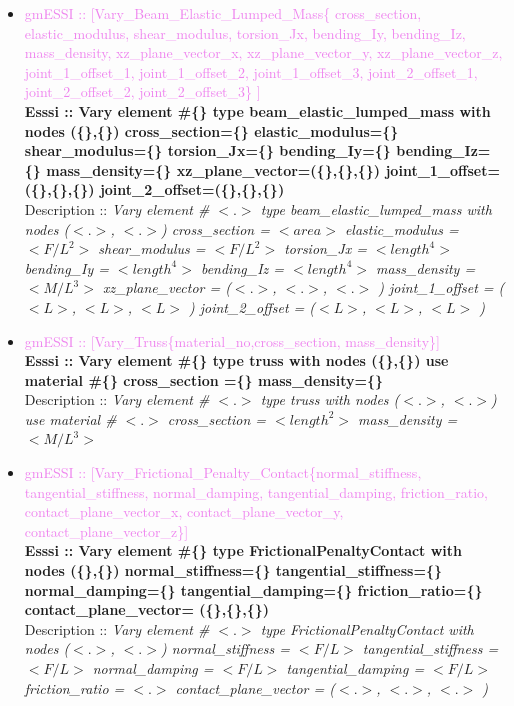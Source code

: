 \documentclass[11pt]{article}
\begin{document}
\begin{itemize}

  \item \textcolor{violet}{gmESSI :: [Vary\_Beam\_Elastic\_Lumped\_Mass\{ cross\_section, elastic\_modulus, shear\_modulus, torsion\_Jx, bending\_Iy, bending\_Iz, mass\_density, xz\_plane\_vector\_x, xz\_plane\_vector\_y, xz\_plane\_vector\_z, joint\_1\_offset\_1, joint\_1\_offset\_2, joint\_1\_offset\_3, joint\_2\_offset\_1, joint\_2\_offset\_2, joint\_2\_offset\_3\} ]} \\             
  \textbf{Esssi :: Vary element \#\{\} type beam\_elastic\_lumped\_mass with nodes (\{\},\{\}) cross\_section=\{\} elastic\_modulus=\{\} shear\_modulus=\{\} torsion\_Jx=\{\} bending\_Iy=\{\} bending\_Iz=\{\} mass\_density=\{\}  xz\_plane\_vector=(\{\},\{\},\{\}) joint\_1\_offset=(\{\},\{\},\{\}) joint\_2\_offset=(\{\},\{\},\{\})}\\
  Description :: \textit{ Vary element \# $<.>$ type beam\_elastic\_lumped\_mass with nodes ($<.>$, $<.>$) cross\_section = $<area>$ elastic\_modulus = $<F/L^2>$ shear\_modulus = $<F/L^2>$ torsion\_Jx = $<length^4>$ bending\_Iy = $<length^4>$ bending\_Iz = $<length^4>$ mass\_density = $<M/L^3>$  xz\_plane\_vector = ($<.>$, $<.>$, $<.>$ ) joint\_1\_offset = ($<L>$, $<L>$, $<L>$ ) joint\_2\_offset = ($<L>$, $<L>$, $<L>$ )}

  \item \textcolor{violet}{gmESSI :: [Vary\_Truss\{material\_no,cross\_section, mass\_density\}]} \\             
  \textbf{Esssi :: Vary element \#\{\} type truss with nodes (\{\},\{\}) use material \#\{\} cross\_section =\{\} mass\_density=\{\}}\\
  Description :: \textit{ Vary element \# $<.>$ type truss with nodes ($<.>$, $<.>$) use material \# $<.>$ cross\_section = $<length^2>$ mass\_density = $<M/L^3>$ }

  \item \textcolor{violet}{gmESSI :: [Vary\_Frictional\_Penalty\_Contact\{normal\_stiffness, tangential\_stiffness, normal\_damping, tangential\_damping, friction\_ratio, contact\_plane\_vector\_x, contact\_plane\_vector\_y, contact\_plane\_vector\_z\}]} \\             
  \textbf{Esssi :: Vary element \#\{\} type FrictionalPenaltyContact with nodes (\{\},\{\}) normal\_stiffness=\{\} tangential\_stiffness=\{\}  normal\_damping=\{\} tangential\_damping=\{\} friction\_ratio=\{\} contact\_plane\_vector= (\{\},\{\},\{\})}\\
  Description :: \textit{ Vary element \# $<.>$ type FrictionalPenaltyContact with nodes ($<.>$, $<.>$) normal\_stiffness = $<F/L>$ tangential\_stiffness = $<F/L>$  normal\_damping = $<F/L>$ tangential\_damping = $<F/L>$  friction\_ratio = $<.>$ contact\_plane\_vector = ($<.>$, $<.>$, $<.>$ )}


\end{itemize}
\end{document}
